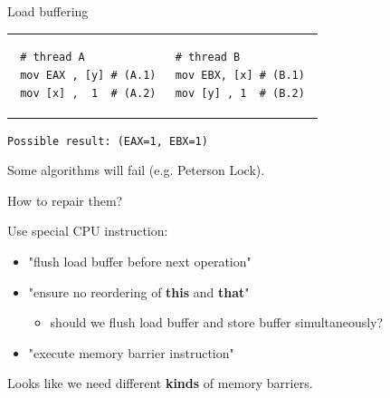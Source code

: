 \begin{frame}[fragile]{Load buffering}



 \begin{tabular}{p{} p{}}
 \begin{verbatim}
 # thread A
 mov EAX , [y] # (A.1)
 mov [x] ,  1  # (A.2)
 \end{verbatim}
 
 & 
 
 \begin{verbatim}
 # thread B          
 mov EBX, [x] # (B.1) 
 mov [y] , 1  # (B.2) 
 \end{verbatim}
\end{tabular}

\texttt{Possible result: (EAX=1, EBX=1)}

\pause

Some algorithms will fail (e.g. Peterson Lock).

\pause

How to repair them?

\pause

Use special CPU instruction:
\begin{itemize}
    \pause
    \item "flush load buffer before next operation"
    \pause
    \item "ensure no reordering of \textbf{this} and \textbf{that}" 
    \begin{itemize}
        \pause 
        \item should we flush load buffer and store buffer simultaneously?
    \end{itemize}
    \pause
    \item "execute memory barrier instruction"
\end{itemize}

\pause
Looks like we need different \textbf{kinds} of memory barriers.

\end{frame}


